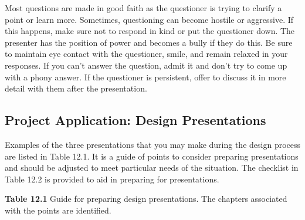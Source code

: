 Most questions are made in good faith as the questioner is trying to
clarify a point or learn more. Sometimes, questioning can become hostile
or aggressive. If this happens, make sure not to respond in kind or put
the questioner down. The presenter has the position of power and becomes
a bully if they do this. Be sure to maintain eye contact with the
questioner, smile, and remain relaxed in your responses. If you can't
answer the question, admit it and don't try to come up with a phony
answer. If the questioner is persistent, offer to discuss it in more
detail with them after the presentation.

\subsection{Project Application: Design
Presentations}\label{project-application-design-presentations}

Examples of the three presentations that you may make during the design
process are listed in Table 12.1. It is a guide of points to consider
preparing presentations and should be adjusted to meet particular needs
of the situation. The checklist in Table 12.2 is provided to aid in
preparing for presentations.

\textbf{\hfill\break
Table 12.1} Guide for preparing design presentations. The chapters
associated with the points are identified.

